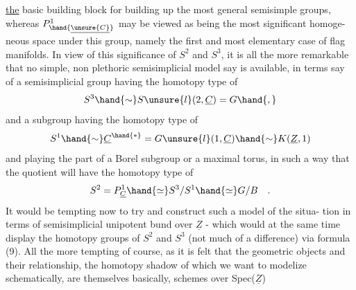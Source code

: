 
\uline{the} basic building block for building up the most general semisimple
groups,  whereas $P^{1}_{\hand{\underline{\unsure{C}}}}$ may be viewed as being the most significant homoge-%
neous space under this group,  namely the first and most elementary case
of flag manifolds.  In view of this significance of $S^2$ and $S^3$,  it is all
the more remarkable that no simple, non plethoric semisimplicial model
say is available,  in terms say of a semisimplicial group having the
homotopy type of 
\[ S^3 \hand{\sim} S\unsure{l}(2,\underline{C} )= G \hand{,} \]
and a subgroup having the homotopy type of
\[ S^1 \hand{\sim} \underline{C}^{\hand{*}} = G\unsure{l}(1,\underline{C}) \hand{\sim} K(\underline{Z},1) \]
and playing the part of a Borel subgroup or a maximal torus,  in such a
way that the quotient will have the homotopy type of
\[ S^2 = P^1_{\underline{C}} \hand{\simeq} S^3/S^1 \hand{\simeq} G/B \quad . \]
It would be tempting now to try and construct such a model of the situa-%
tion in terms of semisimplicial unipotent bund over $\underline{Z}$  - which would
at the same time display the homotopy groups of $S^2$ and $S^3$ (not much of a
difference\hand{!}) via formula (9).  All the more tempting of course,  as it is
felt that the geometric objects and their relationship,  the homotopy
shadow of which we want to modelize  schematically,  are themselves
basically,  schemes over Spec($\underline{Z}$)\hand{!}

